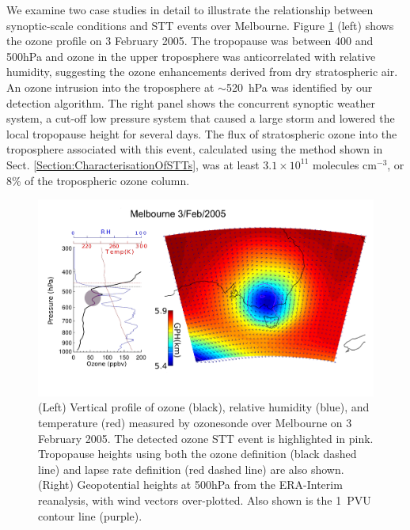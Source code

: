 \documentclass[acp, manuscript]{copernicus} %
\providecommand{\DIFadd}[1]{{\protect\color{blue}\uwave{#1}}} %
\providecommand{\DIFaddbegin}{} %
\providecommand{\DIFaddend}{} %
\providecommand{\DIFaddFL}[1]{\DIFadd{#1}} %
\providecommand{\DIFaddbeginFL}{} %
\providecommand{\DIFaddendFL}{} %
\begin{document}
    We examine two case studies in detail to illustrate the relationship between synoptic-scale conditions and STT events  over Melbourne.
    Figure \ref{fig:Melbourne20050203} (left) shows the ozone profile on 3 February 2005.
    The tropopause was between 400 and 500\DIFaddbegin \DIFadd{~}\DIFaddend hPa and ozone in the upper troposphere was anticorrelated with relative humidity, suggesting the ozone enhancements derived from dry stratospheric air. 
    An ozone intrusion into the troposphere at $\sim$520~hPa was identified by our detection algorithm.
    The right panel shows the concurrent synoptic weather system, a cut-off low pressure system that caused a large storm and lowered the local tropopause height for several days.
    The flux of stratospheric ozone into the troposphere associated with this event, calculated using the method shown in Sect. \ref{Section:CharacterisationOfSTTs}, was at least $3.1 \times 10^{11}$ molecules cm$^{-3}$, or 8\% of the tropospheric ozone column.

    \begin{figure}[t]
      \includegraphics[width=14.0cm]{figures/Melbourne20050203.png}
      \caption{(Left) Vertical profile of ozone (black), relative humidity (blue), and temperature (red) measured by ozonesonde over Melbourne on 3 February 2005.
      The detected ozone STT event is highlighted in pink.
      Tropopause heights using both the ozone definition (black dashed line) and lapse rate definition (red dashed line) are also shown.
      (Right) Geopotential heights at 500\DIFaddbeginFL \DIFaddFL{~}\DIFaddendFL hPa from the ERA-Interim reanalysis, with wind vectors over-plotted.
      Also shown is the 1~PVU contour line (purple).}
      \label{fig:Melbourne20050203}
    \end{figure}
\end{document}
